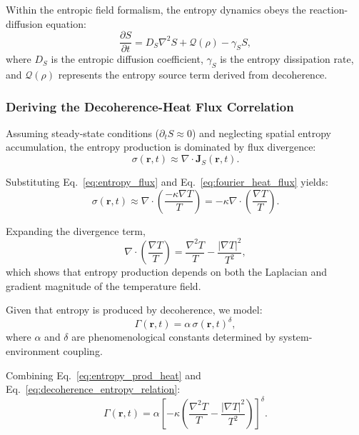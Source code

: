 \documentclass[12pt]{article}
\begin{document}
Within the entropic field formalism, the entropy dynamics obeys the reaction-diffusion equation:
\begin{equation}
\frac{\partial S}{\partial t} = D_S \nabla^2 S + \mathcal{Q}(\rho) - \gamma_S S,
\label{eq:entropy_reaction_diffusion}
\end{equation}
where \(D_S\) is the entropic diffusion coefficient, \(\gamma_S\) is the entropy dissipation rate, and \(\mathcal{Q}(\rho)\) represents the entropy source term derived from decoherence.

\subsubsection*{Deriving the Decoherence-Heat Flux Correlation}

Assuming steady-state conditions (\(\partial_t S \approx 0\)) and neglecting spatial entropy accumulation, the entropy production is dominated by flux divergence:
\begin{equation}
\sigma(\mathbf{r}, t) \approx \nabla \cdot \mathbf{J}_S(\mathbf{r}, t).
\label{eq:steady_entropy_prod}
\end{equation}

Substituting Eq.~\eqref{eq:entropy_flux} and Eq.~\eqref{eq:fourier_heat_flux} yields:
\begin{equation}
\sigma(\mathbf{r}, t) \approx \nabla \cdot \left( \frac{-\kappa \nabla T}{T} \right) = - \kappa \nabla \cdot \left( \frac{\nabla T}{T} \right).
\label{eq:entropy_prod_heat}
\end{equation}

Expanding the divergence term,
\begin{equation}
\nabla \cdot \left( \frac{\nabla T}{T} \right) = \frac{\nabla^2 T}{T} - \frac{|\nabla T|^2}{T^2},
\label{eq:divergence_expansion}
\end{equation}
which shows that entropy production depends on both the Laplacian and gradient magnitude of the temperature field.

Given that entropy is produced by decoherence, we model:
\begin{equation}
\Gamma(\mathbf{r}, t) = \alpha \, \sigma(\mathbf{r}, t)^{\delta},
\label{eq:decoherence_entropy_relation}
\end{equation}
where \(\alpha\) and \(\delta\) are phenomenological constants determined by system-environment coupling.

Combining Eq.~\eqref{eq:entropy_prod_heat} and Eq.~\eqref{eq:decoherence_entropy_relation}:
\begin{equation}
\Gamma(\mathbf{r}, t) = \alpha \left[ -\kappa \left( \frac{\nabla^2 T}{T} - \frac{|\nabla T|^2}{T^2} \right) \right]^\delta.
\label{eq:decoherence_temp_gradient}
\end{equation}
\end{document}
